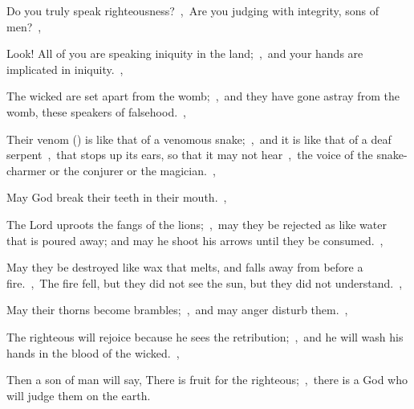 \documentclass[12pt,twoside,a5paper]{article}
\begin{document}
\begin{normalparskip}
  Do you truly speak righteousness?~\sep\ Are you judging with integrity, sons of men?~\sep


  Look! All of you are speaking iniquity in the land;~\sep\ and your hands are implicated in iniquity.~\sep

  The wicked are set apart from the womb;~\sep\ and they have gone astray from the womb, these speakers of falsehood.~\sep

  Their venom () is like that of a venomous snake;~\sep\ and it is like that of a deaf serpent~\sep\ that stops up its ears, so that it may not hear~\sep\ the voice of the snake-charmer or the conjurer or the magician.~\sep

  May God break their teeth in their mouth.~\sep

  The Lord uproots the fangs of the lions;~\sep\ may they be rejected as like water that is poured away; and may he shoot his arrows until they be consumed.~\sep

  May they be destroyed like wax that melts, and falls away from before a fire.~\sep\ The fire fell, but they did not see the sun, but they did not understand.~\sep

  May their thorns become brambles;~\sep\ and may anger disturb them.~\sep

  The righteous will rejoice because he sees the retribution;~\sep\ and he will wash his hands in the blood of the wicked.~\sep

  Then a son of man will say, There is fruit for the righteous;~\sep\ there is a God who will judge them on the earth.
\end{normalparskip}





\end{document}

